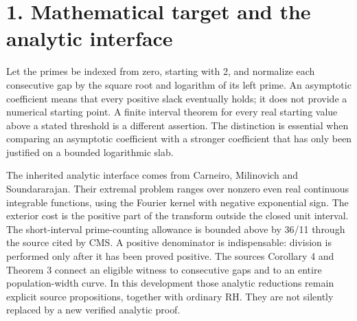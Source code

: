 \documentclass[11pt]{article}
\begin{document}
\begin{center}


\ifdim\wd\eqbox>\linewidth\resizebox{\linewidth}{!}{\usebox{\eqbox}}\else\usebox{\eqbox}\fi

\end{center}

\section{1. Mathematical target and the analytic interface}

Let the primes be indexed from zero, starting with 2, and normalize each consecutive gap by the square root and logarithm of its left prime. An asymptotic coefficient means that every positive slack eventually holds; it does not provide a numerical starting point. A finite interval theorem for every real starting value above a stated threshold is a different assertion. The distinction is essential when comparing an asymptotic coefficient with a stronger coefficient that has only been justified on a bounded logarithmic slab.


The inherited analytic interface comes from Carneiro, Milinovich and Soundararajan. Their extremal problem ranges over nonzero even real continuous integrable functions, using the Fourier kernel with negative exponential sign. The exterior cost is the positive part of the transform outside the closed unit interval. The short-interval prime-counting allowance is bounded above by 36/11 through the source cited by CMS. A positive denominator is indispensable: division is performed only after it has been proved positive. The sources Corollary 4 and Theorem 3 connect an eligible witness to consecutive gaps and to an entire population-width curve. In this development those analytic reductions remain explicit source propositions, together with ordinary RH. They are not silently replaced by a new verified analytic proof.


\begin{center}


\ifdim\wd\eqbox>\linewidth\resizebox{\linewidth}{!}{\usebox{\eqbox}}\else\usebox{\eqbox}\fi

\end{center}
\end{document}
